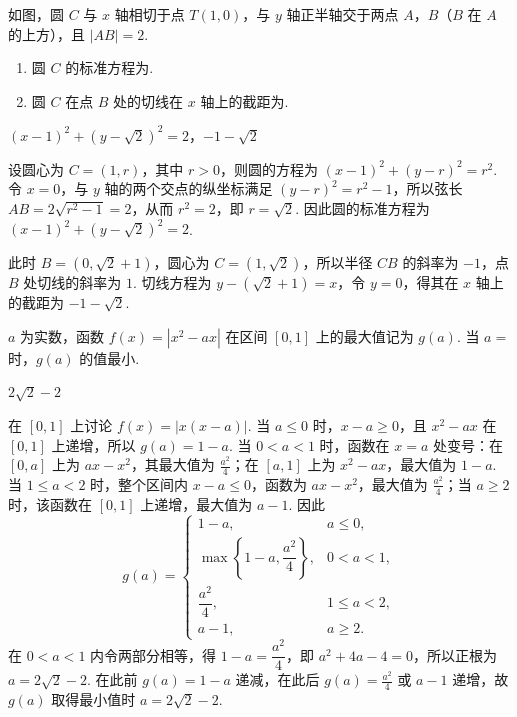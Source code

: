 \begin{problem}
如图，圆 \(C\) 与 \(x\) 轴相切于点 \(T(1,0)\)，与 \(y\) 轴正半轴交于两点 \(A\)，\(B\)（\(B\) 在 \(A\) 的上方），且 \(|AB|=2\).

\begin{enumerate}
\item 圆 \(C\) 的标准方程为\fillinblank{}.
\item 圆 \(C\) 在点 \(B\) 处的切线在 \(x\) 轴上的截距为\fillinblank{}.
\end{enumerate}

\end{problem}

\begin{answer}
\((x-1)^2+(y-\sqrt{2})^2=2\)，\(-1-\sqrt{2}\)
\end{answer}

\begin{solution}
设圆心为 \(C=(1,r)\)，其中 \(r>0\)，则圆的方程为 \((x-1)^2+(y-r)^2=r^2\). 令 \(x=0\)，与 \(y\) 轴的两个交点的纵坐标满足 \((y-r)^2=r^2-1\)，所以弦长 \(AB=2\sqrt{r^2-1}=2\)，从而 \(r^2=2\)，即 \(r=\sqrt2\). 因此圆的标准方程为 \((x-1)^2+(y-\sqrt2)^2=2\).

此时 \(B=(0,\sqrt2+1)\)，圆心为 \(C=(1,\sqrt2)\)，所以半径 \(CB\) 的斜率为 \(-1\)，点 \(B\) 处切线的斜率为 \(1\). 切线方程为 \(y-(\sqrt2+1)=x\)，令 \(y=0\)，得其在 \(x\) 轴上的截距为 \(-1-\sqrt2\).
\end{solution}

\begin{problem}
\(a\) 为实数，函数 \(f(x)=|x^2-ax|\) 在区间 \([0,1]\) 上的最大值记为 \(g(a)\). 当 \(a=\)\fillinblank{} 时，\(g(a)\) 的值最小.
\end{problem}

\begin{answer}
\(2\sqrt{2}-2\)
\end{answer}

\begin{solution}
在 \([0,1]\) 上讨论 \(f(x)=|x(x-a)|\). 当 \(a\leqslant0\) 时，\(x-a\geqslant0\)，且 \(x^2-ax\) 在 \([0,1]\) 上递增，所以 \(g(a)=1-a\). 当 \(0<a<1\) 时，函数在 \(x=a\) 处变号：在 \([0,a]\) 上为 \(ax-x^2\)，其最大值为 \(\frac{a^2}{4}\)；在 \([a,1]\) 上为 \(x^2-ax\)，最大值为 \(1-a\). 当 \(1\leqslant a<2\) 时，整个区间内 \(x-a\leqslant0\)，函数为 \(ax-x^2\)，最大值为 \(\frac{a^2}{4}\)；当 \(a\geqslant2\) 时，该函数在 \([0,1]\) 上递增，最大值为 \(a-1\). 因此
\[
g(a)=
\begin{cases}
1-a, & a\leqslant0,\\
\max\left\{1-a,\dfrac{a^2}{4}\right\}, & 0<a<1,\\
\dfrac{a^2}{4}, & 1\leqslant a<2,\\
a-1, & a\geqslant2.
\end{cases}
\]
在 \(0<a<1\) 内令两部分相等，得 \(1-a=\dfrac{a^2}{4}\)，即 \(a^2+4a-4=0\)，所以正根为 \(a=2\sqrt2-2\). 在此前 \(g(a)=1-a\) 递减，在此后 \(g(a)=\frac{a^2}{4}\) 或 \(a-1\) 递增，故 \(g(a)\) 取得最小值时 \(a=2\sqrt2-2\).
\end{solution}

